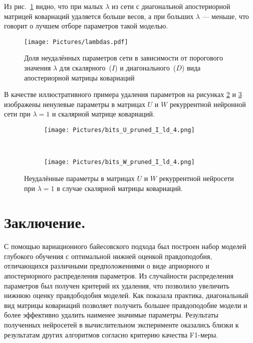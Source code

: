 \documentclass[12pt, fleqn, unicode]{article}
\begin{document}
Из рис.~\ref{lambdas} видно, что при малых $\lambda$ из сети с диагональной апостериорной матрицей ковариаций удаляется больше весов, а при больших $\lambda$ --- меньше, что говорит о лучшем отборе параметров такой моделью.
\begin{figure}[ht]
	\centering
	\texttt{[image: Pictures/lambdas.pdf]}
	\caption{Доля неудалённых параметров сети в зависимости от порогового значения $\lambda$ для скалярного~($I$) и диагонального~($D$) вида апостериорной матрицы ковариаций}
	\label{lambdas}
\end{figure}

В качестве иллюстративного примера удаления параметров на рисунках \ref{matrix_U} и \ref{matrix_W} изображены ненулевые параметры в матрицах $U$ и $W$ рекуррентной нейронной сети при $\lambda = 1$ и скалярной матрице ковариаций.

\begin{figure}
	\centering
	\begin{subfigure}[ht!]{0.33\textwidth}
		\texttt{[image: Pictures/bits\_U\_pruned\_I\_ld\_4.png]}
		\caption{}
		\label{matrix_U}
	\end{subfigure}
	~
	\begin{subfigure}[ht!]{0.33\textwidth}
		\texttt{[image: Pictures/bits\_W\_pruned\_I\_ld\_4.png]}
		\caption{}
		\label{matrix_W}
	\end{subfigure}
	\hspace{1mm}
	\caption{Неудалённые параметры в матрицах $U$ и $W$ рекуррентной нейросети при $\lambda=1$ в случае скалярной матрицы ковариаций.}
	\label{matrix_U_W}
\end{figure}

\newpage
\section{Заключение.}
С помощью вариационного байесовского подхода был построен набор моделей глубокого обучения с оптимальной нижней оценкой правдоподобия, отличающихся различными предположениями о виде априорного и апостериорного распределения параметров. Из случайности распределения параметров был получен критерий их удаления, что позволило увеличить нижнюю оценку правдободобия моделей. Как показала практика, диагональный вид матрицы ковариаций позволяет получить большее правдоподобие модели и более эффективно удалить наименее значимые параметры.
Результаты полученных нейросетей в вычислительном эксперименте оказались близки к результатам других алгоритмов согласно критерию качества F1-меры.
\end{document}
